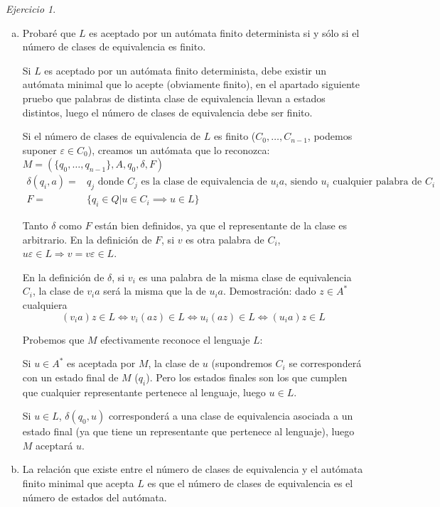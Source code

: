 \documentclass[12pt,spanish]{article}
\theoremstyle{definition}
\theoremstyle{remark}
\newtheorem{exercise}{Ejercicio}%
\begin{document}
\begin{exercise}
\begin{enumerate}[a)]
  \item Probaré que $L$ es aceptado por un autómata finito
    determinista si y sólo si el número de clases de equivalencia es
    finito.

    Si $L$ es aceptado por un autómata finito determinista, debe
    existir un autómata minimal que lo acepte (obviamente finito), en
    el apartado siguiente pruebo que palabras de distinta clase de
    equivalencia llevan a estados distintos, luego el número de clases
    de equivalencia debe ser finito.

    Si el número de clases de equivalencia de $L$ es finito
    ($C_0,\ldots,C_{n-1}$, podemos suponer $\varepsilon \in C_0$),
    creamos un autómata que lo reconozca:
    $M=(\{q_0,\ldots,q_{n-1}\},A,q_0,\delta,F)$
    \begin{align*}
      \delta(q_i,a)=&q_j \text{ donde $C_j$ es la clase de equivalencia de $u_ia$, siendo $u_i$ cualquier palabra de $C_i$}\\
      F=&\{q_i \in Q | u \in C_i \implies u \in L\}
    \end{align*}

    Tanto $\delta$ como $F$ están bien definidos, ya que el
    representante de la clase es arbitrario. En la definición de $F$,
    si $v$ es otra palabra de $C_i$,
    $u\varepsilon \in L \Rightarrow v = v\varepsilon \in L$.

    En la definición de $\delta$, si $v_i$ es una palabra de la misma
    clase de equivalencia $C_i$, la clase de $v_ia$ será la misma que
    la de $u_ia$. Demostración: dado $z \in A^*$ cualquiera
    \[(v_ia)z \in L \Leftrightarrow v_i(az) \in L \Leftrightarrow
      u_i(az) \in L \Leftrightarrow (u_ia)z \in L\]

    Probemos que $M$ efectivamente reconoce el lenguaje $L$:

    Si $u \in A^*$ es aceptada por $M$, la clase de $u$ (supondremos
    $C_i$ se corresponderá con un estado final de $M$ ($q_i$). Pero
    los estados finales son los que cumplen que cualquier
    representante pertenece al lenguaje, luego $u \in L$.

    Si $u \in L$, $\delta(q_0,u)$ corresponderá a una clase de
    equivalencia asociada a un estado final (ya que tiene un
    representante que pertenece al lenguaje), luego $M$ aceptará $u$.

  \item La relación que existe entre el número de clases de
    equivalencia y el autómata finito minimal que acepta $L$ es que el
    número de clases de equivalencia es el número de estados del
    autómata.


\end{enumerate}
\end{exercise}
\end{document}
